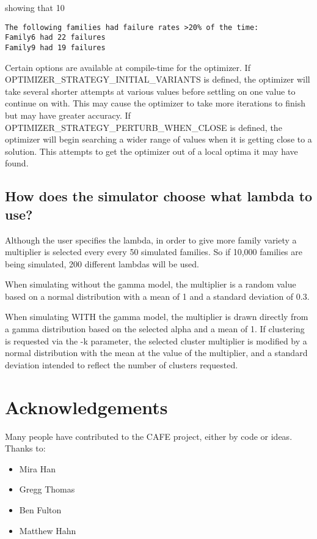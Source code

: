 \documentclass{article}
\begin{document}
showing that 10%

\begin{lstlisting}
The following families had failure rates >20% of the time:
Family6 had 22 failures
Family9 had 19 failures
\end{lstlisting}

Certain options are available at compile-time for the optimizer. If OPTIMIZER\_STRATEGY\_INITIAL\_VARIANTS is defined, the optimizer
will take several shorter attempts at various values 
before settling on one value to continue on with. This may cause the optimizer to take more iterations to finish but may have 
greater accuracy. If OPTIMIZER\_STRATEGY\_PERTURB\_WHEN\_CLOSE is defined, the optimizer will begin searching a wider range of values
when it is getting close to a solution. This attempts to get the optimizer out of a local optima it may have found.

\subsection{How does the simulator choose what lambda to use?}

Although the user specifies the lambda, in order to give more
family variety a multiplier is selected every every 50 simulated families. So if 10,000 families are being simulated, 200 different lambdas will be used.

When simulating without the gamma model, the multiplier is a
random value based on a normal distribution
with a mean of 1 and a standard deviation of 0.3.

When simulating WITH the gamma model, the multiplier is drawn 
directly from a gamma distribution based on the selected alpha
and a mean of 1. If clustering is requested via the -k parameter,
the selected cluster multiplier is modified by a normal distribution
with the mean at the value of the multiplier, and a standard
deviation intended to reflect the number of clusters requested.

\section{Acknowledgements}
Many people have contributed to the CAFE project, either by code or ideas. Thanks to:
\begin{itemize}
  \item Mira Han
  \item Gregg Thomas
  \item Ben Fulton
  \item Matthew Hahn
\end{itemize}


\end{document}
